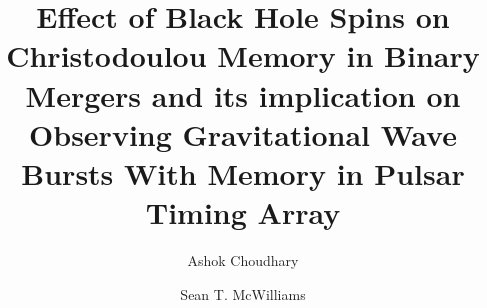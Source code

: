 \documentclass[twocolumn,showpacs,aps,prd,nobibnotes,floatfix]{revtex4-1}
\begin{document}
\newcommand{\be}{\begin{equation}}
\newcommand{\ee}{\end{equation}}
\newcommand{\ber}{\begin{eqnarray}}
\newcommand{\eer}{\end{eqnarray}}
\def\bea{\begin{eqnarray}}
\def\eea{\end{eqnarray}}
\newcommand{\etal}{\emph{et al.}}

\newcommand{\Sl}{S_\ell}
\newcommand{\Sigmal}{\Sigma_\ell}
\newcommand{\Flux}{\mathcal{F}}
\newcommand{\LNh}{\hat{\mathbf{L}}_N}
\newcommand{\LN}{\mathbf{L}_N}
\newcommand{\bS}{\mathbf{S}}
\newcommand{\bJ}{\mathbf{J}}
\newcommand{\e}{\mathrm{e}}
\newcommand{\rmi}{\mathrm{i}}
\newcommand{\flow}{f_\mathrm{low}}
\newcommand{\fcut}{f_\mathrm{cut}}

\newcommand{\bchi}{\bm{\chi}}
\newcommand{\blambda}{\bm{\lambda}}
\newcommand{\bLambda}{\bm{\Lambda}}
\newcommand{\bchia}{\bm{\chi}_a}
\newcommand{\bchis}{\bm{\chi}_s}
\newcommand{\chis}{\chi_s}
\newcommand{\chia}{\chi_a}
\newcommand{\chiadL}{\bchia \cdot \LNh}
\newcommand{\chisdL}{\bchis \cdot \LNh}
\newcommand{\chisSqr}{\bchis^2}
\newcommand{\chiaSqr}{\bchia^2}
\newcommand{\chisDchia}{\bchis \cdot \bchia}
\newcommand{\cA}{\mathcal{A}}
\newcommand{\cB}{\mathcal{B}}
\newcommand{\cC}{\mathcal{C}}
\newcommand{\cP}{\mathcal{P}}
\newcommand{\pc}{{+,\times}}

\title{Effect of Black Hole Spins on Christodoulou Memory in Binary Mergers and its implication on Observing Gravitational Wave Bursts With Memory in Pulsar Timing Array}
\author{Ashok Choudhary}
\author{Sean T. McWilliams}
\end{document}
